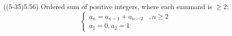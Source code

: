 \item \begin{theorem}{((5-35)5.56)} Ordered sum of positive integers, where each summand is $\ge 2$: \begin{equation}
        \begin{cases}
            a_n = a_{n - 1} + a_{n - 2} &, n \ge 2 \\
            a_1 = 0, a_2 = 1     
        \end{cases}
    \end{equation}
\end{theorem}

